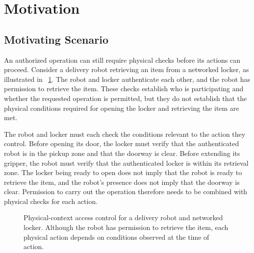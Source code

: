 \documentclass[sigconf,authordraft]{acmart}
\begin{document}
\section{Motivation}
\label{sec:motivation}

\subsection{Motivating Scenario}

An authorized operation can still require physical checks before its actions can proceed.
Consider a delivery robot retrieving an item from a networked locker, as illustrated in \figurename~\ref{fig:motivation}.
The robot and locker authenticate each other, and the robot has permission to retrieve the item.
These checks establish who is participating and whether the requested operation is permitted, but they do not establish that the physical conditions required for opening the locker and retrieving the item are met.

The robot and locker must each check the conditions relevant to the action they control.
Before opening its door, the locker must verify that the authenticated robot is in the pickup zone and that the doorway is clear.
Before extending its gripper, the robot must verify that the authenticated locker is within its retrieval zone.
The locker being ready to open does not imply that the robot is ready to retrieve the item, and the robot's presence does not imply that the doorway is clear.
Permission to carry out the operation therefore needs to be combined with physical checks for each action.

\begin{figure}[t]
    \centering
    \caption{Physical-context access control for a delivery robot and networked locker. Although the robot has permission to retrieve the item, each physical action depends on conditions observed at the time of action.}
    \label{fig:motivation}
\end{figure}
\end{document}
